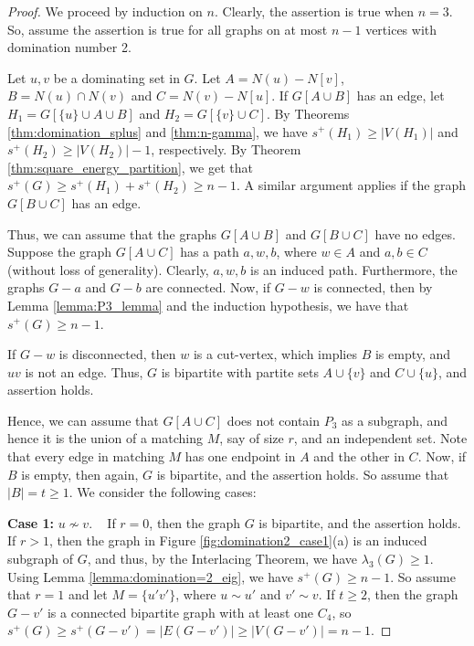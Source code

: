 \documentclass{article}
\begin{document}
\begin{proof}
We proceed by induction on $n$. Clearly, the assertion is true when $n=3$. So, assume the assertion is true for all graphs on at most $n-1$ vertices with domination number 2. 

Let $u,v$ be a dominating set in $G$. Let $A= N(u)- N[v]$, $B=N(u)\cap N(v)$ and $C= N(v) - N[u]$. If $G[A\cup B]$ has an edge, let $H_1 = G[\{u\} \cup A \cup B]$ and $H_2 = G[\{v\} \cup C]$. By Theorems \ref{thm:domination_splus} and \ref{thm:n-gamma}, we have $s^+(H_1) \geq |V(H_1)|$ and $s^+(H_2) \geq |V(H_2)|-1$, respectively. By Theorem \ref{thm:square_energy_partition}, we get that $s^+(G) \geq s^+(H_1)  + s^+(H_2) \geq n-1.$ A similar argument applies if the graph $G[B \cup C]$ has an edge. 

Thus, we can assume that the graphs $G[A\cup B]$ and $G[B\cup C]$ have no edges. Suppose
the graph $G[A \cup C]$ has a path $a,w,b$, where $w \in A$ and $a, b \in C$ (without loss of generality). Clearly, $a,w,b$ is an induced path. Furthermore, the graphs $G-a$ and $G-b$ are connected. Now, if $G-w$ is connected, then by Lemma \ref{lemma:P3_lemma} and the induction hypothesis, we have that $s^+(G)\geq n-1$. 
 
If $G-w$ is disconnected, then $w$ is a cut-vertex, which implies $B$ is empty, and $uv$ is not an edge. Thus, $G$ is bipartite with partite sets $A\cup \{v\}$ and $C\cup \{u\}$, and assertion holds. 
    
Hence, we can assume that $G[A\cup C]$ does not contain $P_3$ as a subgraph, and hence it is the union of a matching $M$, say of size $r$, and an independent set. Note that every edge in matching $M$ has one endpoint in $A$ and the other in $C$. Now, if $B$ is empty, then again, $G$ is bipartite, and the assertion holds. So assume that $|B|=t\ge 1$. We consider the following cases:

\textbf{Case 1:} $u\nsim v$. ~ If $r=0$, then the graph $G$ is bipartite, and the assertion holds. If $r>1$, then the graph in Figure \ref{fig:domination2_case1}(a) is an induced subgraph of $G$, and thus, by the Interlacing Theorem, we have $\lambda_3(G) \geq 1$. Using Lemma \ref{lemma:domination=2_eig}, we have $s^+(G) \geq n-1$. So assume that $r=1$ and let $M=\{u'v'\}$, where $u\sim u'$ and $v'\sim v$. If $t \ge 2$, then the graph $G-v'$ is a connected bipartite graph with at least one $C_4$, so $s^+(G) \ge s^+(G-v') = |E(G-v')|\ge |V(G-v')| = n-1$.   


\end{proof}
\end{document}
